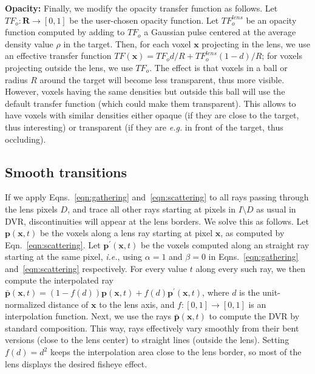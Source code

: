 \vspace{0.2cm}
\noindent\textbf{Opacity:} Finally, we modify the opacity transfer function as follows. Let $TF_{o} : \mathbf{R} \rightarrow [0,1]$ be the user-chosen opacity function. Let  $TF^{lens}_{o}$ be an opacity function computed by adding to $TF_{o}$ a Gaussian pulse centered at the average density value $\rho$ in the target. Then, for each voxel $\mathbf{x}$ projecting in the lens, we use an effective transfer function $TF(\mathbf{x}) = TF_{o} d/R + TF^{lens}_{o} (1-d)/R$; for voxels projecting outside the lens, we use $TF_{o}$. The effect is that voxels in a ball or radius $R$ around the target will become less transparent, thus more visible. However, voxels having the same densities but outside this ball will use the default transfer function (which could make them transparent). This allows to have voxels with similar densities either opaque (if they are close to the target, thus interesting) or transparent (if they are \emph{e.g.} in front of the target, thus occluding).


\subsection{Smooth transitions}
\label{continuity}
%
If we apply Eqns.~\ref{eqn:gathering} and~\ref{eqn:scattering} to all rays passing through the lens pixels $D$, and trace all other rays starting at pixels in $I \setminus D$ as usual in DVR, discontinuities will appear at the lens borders. We solve this as follows. Let $\mathbf{p}(\mathbf{x},t)$ be the voxels along a lens ray starting at pixel $\mathbf{x}$, as computed by Eqn.~\ref{eqn:scattering}. Let $\mathbf{p}^{\prime}(\mathbf{x},t)$ be the voxels computed along an straight ray starting at the same pixel, \emph{i.e.}, using $\alpha=1$ and $\beta=0$ in Eqns.~\ref{eqn:gathering} and~\ref{eqn:scattering} respectively. For every value $t$ along every such ray, we then compute the interpolated ray
$\bar{\mathbf{p}}(\mathbf{x},t) = (1-f(d))\mathbf{p}(\mathbf{x},t) + f(d)\mathbf{p}^{\prime}(\mathbf{x},t)$, where $d$ is the unit-normalized distance of $\mathbf{x}$ to the lens axis, and $f : [0,1] \rightarrow [0,1]$ is an interpolation function. Next, we use the rays $\bar{\mathbf{p}}(\mathbf{x},t)$ to compute the DVR by standard composition. This way, rays effectively vary smoothly from their bent versions (close to the lens center) to straight lines (outside the lens). Setting $f(d) = d^2$ keeps the interpolation area close to the lens border, so most of the lens displays the desired fisheye effect.

